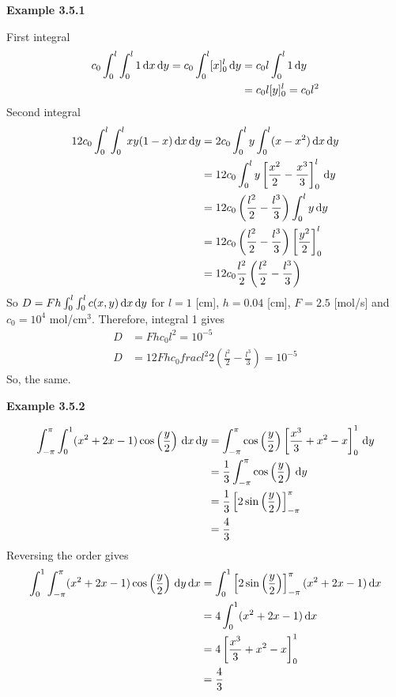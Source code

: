 \vspace{10mm}
\textbf{Example 3.5.1}

First integral
\begin{align*}
    c_0 \int_0^l \int_0^l 1 \, {\rm d} x \, {\rm d} y = c_0 \int_0^l [x]_0^l \, {\rm d} y &= c_0 l \int_0^l 1 \, {\rm d} y\\
    &= c_0 l[y]_0^l = c_0 l^2\\
\end{align*}
Second integral
\begin{align*}
    12 c_0 \int_0^l \int_0^l xy(1-x) \, {\rm d} x \, {\rm d} y &= 2 c_0 \int_0^l y \int_0^l (x-x^2) \, {\rm d} x \, {\rm d} y\\
    &= 12 c_0 \int_0^l y \left[\frac{x^2}{2} - \frac{x^3}{3} \right]_0^l \, {\rm d} y\\
    &= 12 c_0 \left(\frac{l^2}{2} - \frac{l^3}{3}\right) \int_0^l y \, {\rm d} y\\
    &= 12 c_0 \left(\frac{l^2}{2} - \frac{l^3}{3}\right) \left[\frac{y^2}{2}\right]_0^l \\
    &= 12c_0 \frac{l^2}{2} \left(\frac{l^2}{2} - \frac{l^3}{3}\right)
\end{align*}
So $D = Fh \int_0^l \int_0^l c(x,y) \, {\rm d} x \, {\rm d} y $ for $l=1$ [cm], $h=0.04$ [cm], $F=2.5$ [mol/s] and $c_0 = 10^{4}$ mol/cm$^3$. Therefore, integral 1 gives
\begin{align*}
D &= Fhc_0l^2 = 10^{-5} \\
D &= 12Fhc_0 frac{l^2}{2} \left(\frac{l^2}{2} - \frac{l^3}{3}\right) = 10^{-5} 
\end{align*}
So, the same.

\vspace{10mm}
\textbf{Example 3.5.2}

\begin{align*}
    \int_{-\pi}^\pi \int_0^1 (x^2 + 2x - 1) \cos \left(\frac{y}{2} \right)\, {\rm d} x \, {\rm d} y &= \int_{-\pi}^\pi \cos \left(\frac{y}{2} \right) \left[ \frac{x^3}{3} + x^2 - x\right]_0^1  \, {\rm d} y\\
    &= \frac{1}{3}  \int_{-\pi}^\pi \cos \left(\frac{y}{2} \right) \, {\rm d} y\\
    &= \frac{1}{3} \left[2 \sin \left(\frac{y}{2}\right)\right]_{-\pi}^\pi\\
    &= \frac{4}{3}
\end{align*}
Reversing the order gives
\begin{align*}
    \int_0^1 \int_{-\pi}^\pi (x^2 + 2x - 1) \cos \left(\frac{y}{2} \right) \, {\rm d} y \, {\rm d} x  &= \int_0^1 \left[2 \sin \left(\frac{y}{2}\right)\right]_{-\pi}^\pi (x^2 + 2x - 1)  \, {\rm d} x\\
    &= 4 \int_0^1(x^2 + 2x - 1)  \, {\rm d} x\\
    &= 4  \left[ \frac{x^3}{3} + x^2 - x\right]_0^1\\
    &= \frac{4}{3}
\end{align*}